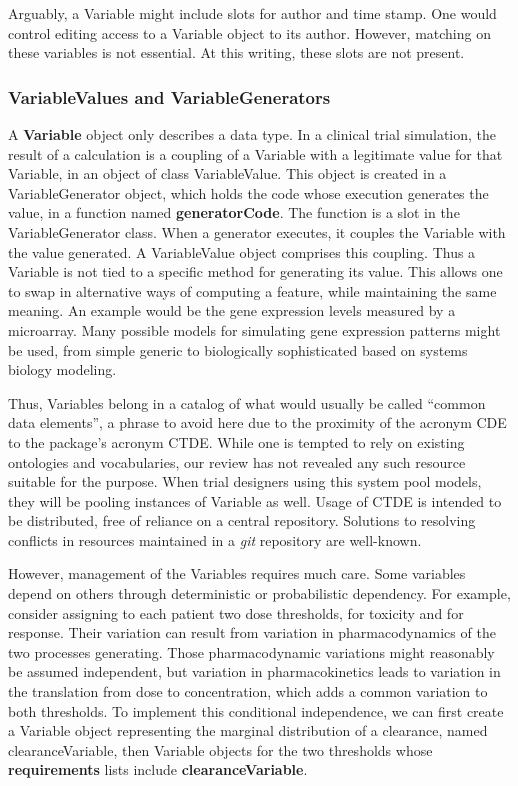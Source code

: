 \documentclass[12pt]{amsart}
\def\code<#1>{\textbf{#1}}
\begin{document}
Arguably, a Variable might include slots for author and time stamp.
One would control editing access to a Variable object to its author.
However, matching on these variables is not essential.
At this writing, these slots are not present.

\subsubsection{VariableValues and VariableGenerators}

A \code<Variable> object only describes a data type. 
In a clinical trial simulation, 
the result of a calculation is a coupling of
a Variable with a legitimate value for that Variable, in an object of class VariableValue.
This object is created in a VariableGenerator object,
which holds the code whose execution generates the value,
in a function named \code<generatorCode>.
The function is a slot in the VariableGenerator class.
When a generator executes, it couples the Variable with the value generated.
A VariableValue object comprises this coupling.
Thus a Variable is not tied to a specific method for generating its value.
This allows one to swap in alternative ways of computing a feature,
while maintaining the same meaning.
An example would be the gene expression levels measured by a microarray.
Many possible models for simulating gene expression patterns might be used,
from simple generic to biologically sophisticated based on systems biology modeling.

Thus, Variables belong in a catalog of what would usually be called 
``common data elements'',
a phrase to avoid here due to the proximity of the acronym CDE to the package's
acronym CTDE.
While one is tempted to rely on existing ontologies and
vocabularies, our review has not revealed any such resource
suitable for the purpose. 
When trial designers using this system pool models,
they will be pooling instances of Variable as well.
Usage of CTDE is intended to be distributed,
free of reliance on a central repository.
Solutions to resolving conflicts in resources maintained 
in a \textit{git} repository are well-known.

However, management of the Variables requires much care.
Some variables depend on others through deterministic or probabilistic dependency.
For example, consider assigning to each patient two dose thresholds, for toxicity and for response.
Their variation can result from variation in pharmacodynamics of the
two processes generating. Those pharmacodynamic variations might reasonably be assumed
independent, but variation in pharmacokinetics leads to variation in the 
translation from dose to concentration, which adds a common variation to 
both thresholds.
To implement this conditional independence, 
we can first create a Variable object representing 
the marginal distribution of a clearance,
named clearanceVariable,
then  Variable objects for the two thresholds
whose \code<requirements>  lists include
\code<clearanceVariable>. 
\end{document}
